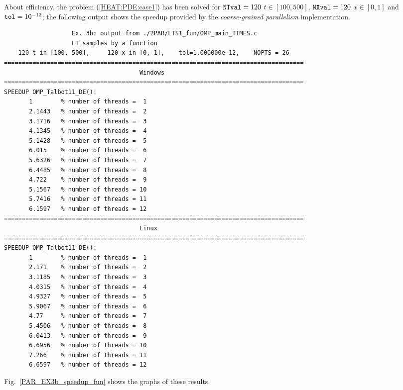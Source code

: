 \documentclass[a4paper,10pt]{report}%
\begin{document}
About efficiency, the problem (\ref{HEAT:PDE:case1}) has been solved for ${\tt NTval}=120$ $t\in[100, 500]$,
${\tt NXval}=120$ $x\in[0,1]$ and ${\tt tol}=10^{-12}$; the following output shows the speedup provided by the
{\em coarse-grained parallelism} implementation.
\begin{lstlisting}
                   Ex. 3b: output from ./2PAR/LTS1_fun/OMP_main_TIMES.c
                   LT samples by a function
    120 t in [100, 500],     120 x in [0, 1],    tol=1.000000e-12,    NOPTS = 26
====================================================================================
                                      Windows
====================================================================================
SPEEDUP OMP_Talbot11_DE():
       1        % number of threads =  1
       2.1443   % number of threads =  2
       3.1716   % number of threads =  3
       4.1345   % number of threads =  4
       5.1428   % number of threads =  5
       6.015    % number of threads =  6
       5.6326   % number of threads =  7
       6.4485   % number of threads =  8
       4.722    % number of threads =  9
       5.1567   % number of threads = 10
       5.7416   % number of threads = 11
       6.1597   % number of threads = 12
====================================================================================
                                      Linux
====================================================================================
SPEEDUP OMP_Talbot11_DE():
       1        % number of threads =  1
       2.171    % number of threads =  2
       3.1185   % number of threads =  3
       4.0315   % number of threads =  4
       4.9327   % number of threads =  5
       5.9067   % number of threads =  6
       4.77     % number of threads =  7
       5.4506   % number of threads =  8
       6.0413   % number of threads =  9
       6.6956   % number of threads = 10
       7.266    % number of threads = 11
       6.6597   % number of threads = 12
\end{lstlisting}
Fig.~\ref{PAR_EX3b_speedup_fun} shows the graphs of these results.
\end{document}
